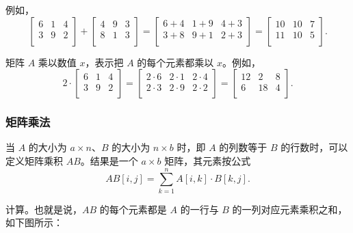 例如，
\[
 \begin{bmatrix}
  6 & 1 & 4 \\
  3 & 9 & 2 \\
 \end{bmatrix}
+
 \begin{bmatrix}
  4 & 9 & 3 \\
  8 & 1 & 3 \\
 \end{bmatrix}
=
 \begin{bmatrix}
  6+4 & 1+9 & 4+3 \\
  3+8 & 9+1 & 2+3 \\
 \end{bmatrix}
=
 \begin{bmatrix}
  10 & 10 & 7 \\
  11 & 10 & 5 \\
 \end{bmatrix}.
\]

矩阵 $A$ 乘以数值 $x$，表示把 $A$ 的每个元素都乘以 $x$。例如，
\[
 2 \cdot \begin{bmatrix}
  6 & 1 & 4 \\
  3 & 9 & 2 \\
 \end{bmatrix}
=
 \begin{bmatrix}
  2 \cdot 6 & 2\cdot1 & 2\cdot4 \\
  2\cdot3 & 2\cdot9 & 2\cdot2 \\
 \end{bmatrix}
=
 \begin{bmatrix}
  12 & 2 & 8 \\
  6 & 18 & 4 \\
 \end{bmatrix}.
\]

\subsubsection{矩阵乘法}


当 $A$ 的大小为 $a \times n$、$B$ 的大小为 $n \times b$ 时，即 $A$ 的列数等于 $B$ 的行数时，可以定义矩阵乘积 $AB$。结果是一个 $a \times b$ 矩阵，其元素按公式
\[
AB[i,j] = \sum_{k=1}^n A[i,k] \cdot B[k,j].
\]

计算。也就是说，$AB$ 的每个元素都是 $A$ 的一行与 $B$ 的一列对应元素乘积之和，如下图所示：

\begin{center}
\end{center}

